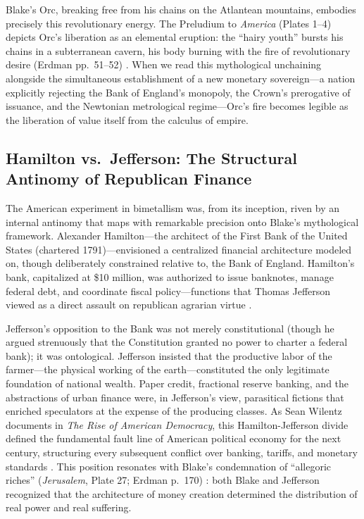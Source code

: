 \documentclass[
]{article}
\begin{document}
Blake's Orc, breaking free from his chains on the Atlantean mountains,
embodies precisely this revolutionary energy. The Preludium to
\emph{America} (Plates 1--4) depicts Orc's liberation as an elemental
eruption: the ``hairy youth'' bursts his chains in a subterranean
cavern, his body burning with the fire of revolutionary desire (Erdman
pp.~51--52) \citep{erdman1988complete}. When we read this mythological
unchaining alongside the simultaneous establishment of a new monetary
sovereign---a nation explicitly rejecting the Bank of England's
monopoly, the Crown's prerogative of issuance, and the Newtonian
metrological regime---Orc's fire becomes legible as the liberation of
value itself from the calculus of empire.

\subsection{Hamilton vs.~Jefferson: The Structural Antinomy of
Republican
Finance}\label{hamilton-vs.-jefferson-the-structural-antinomy-of-republican-finance}

The American experiment in bimetallism was, from its inception, riven by
an internal antinomy that maps with remarkable precision onto Blake's
mythological framework. Alexander Hamilton---the architect of the First
Bank of the United States (chartered 1791)---envisioned a centralized
financial architecture modeled on, though deliberately constrained
relative to, the Bank of England. Hamilton's bank, capitalized at \$10
million, was authorized to issue banknotes, manage federal debt, and
coordinate fiscal policy---functions that Thomas Jefferson viewed as a
direct assault on republican agrarian virtue
\citep{laughlin1898bimetallism, wilentz2005rise}.

Jefferson's opposition to the Bank was not merely constitutional (though
he argued strenuously that the Constitution granted no power to charter
a federal bank); it was ontological. Jefferson insisted that the
productive labor of the farmer---the physical working of the
earth---constituted the only legitimate foundation of national wealth.
Paper credit, fractional reserve banking, and the abstractions of urban
finance were, in Jefferson's view, parasitical fictions that enriched
speculators at the expense of the producing classes. As Sean Wilentz
documents in \emph{The Rise of American Democracy}, this
Hamilton-Jefferson divide defined the fundamental fault line of American
political economy for the next century, structuring every subsequent
conflict over banking, tariffs, and monetary standards
\citep{wilentz2005rise}. This position resonates with Blake's
condemnation of ``allegoric riches'' (\emph{Jerusalem}, Plate 27; Erdman
p.~170) \citep{erdman1988complete, sklar2011blake}: both Blake and
Jefferson recognized that the architecture of money creation determined
the distribution of real power and real suffering.
\end{document}
